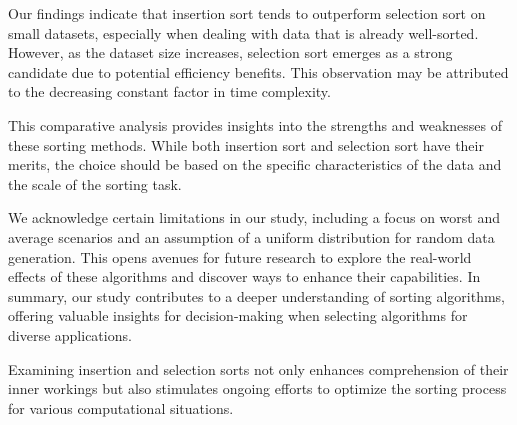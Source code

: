 \documentclass[a4paper,12pt,twocolumn]{article}
\begin{document}
Our findings indicate that insertion sort tends to outperform selection sort on small datasets, especially when dealing with data that is already well-sorted. However, as the dataset size increases, selection sort emerges as a strong candidate due to potential efficiency benefits. This observation may be attributed to the decreasing constant factor in time complexity.

This comparative analysis provides insights into the strengths and weaknesses of these sorting methods. While both insertion sort and selection sort have their merits, the choice should be based on the specific characteristics of the data and the scale of the sorting task.

We acknowledge certain limitations in our study, including a focus on worst and average scenarios and an assumption of a uniform distribution for random data generation. This opens avenues for future research to explore the real-world effects of these algorithms and discover ways to enhance their capabilities. In summary, our study contributes to a deeper understanding of sorting algorithms, offering valuable insights for decision-making when selecting algorithms for diverse applications.

Examining insertion and selection sorts not only enhances comprehension of their inner workings but also stimulates ongoing efforts to optimize the sorting process for various computational situations.

\nocite{*}


\end{document}
